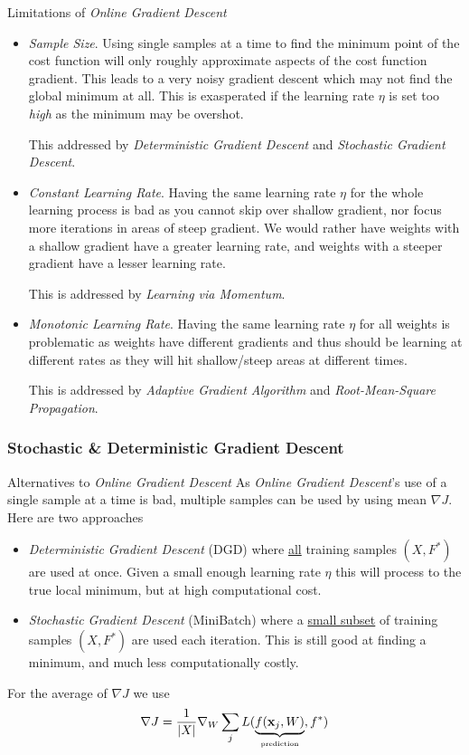 \documentclass[11pt,a4paper]{article}
\begin{document}
  \begin{remark}{Limitations of \textit{Online Gradient Descent}}
    \begin{itemize}
      \item \textit{Sample Size}. Using single samples at a time to find the minimum point of the cost function will only roughly approximate aspects of the cost function gradient. This leads to a very noisy gradient descent which may not find the global minimum at all. This is exasperated if the learning rate $\eta$ is set too \textit{high} as the minimum may be overshot.
      \par This addressed by \textit{Deterministic Gradient Descent} and \textit{Stochastic Gradient Descent}.
      \item \textit{Constant Learning Rate}. Having the same learning rate $\eta$ for the whole learning process is bad as you cannot skip over shallow gradient, nor focus more iterations in areas of steep gradient. We would rather have weights with a shallow gradient have a greater learning rate, and weights with a steeper gradient have a lesser learning rate.
      \par This is addressed by \textit{Learning via Momentum}.
      \item \textit{Monotonic Learning Rate}. Having the same learning rate $\eta$ for all weights is problematic as weights have different gradients and thus should be learning at different rates as they will hit shallow/steep areas at different times.
      \par This is addressed by \textit{Adaptive Gradient Algorithm} and \textit{Root-Mean-Square Propagation}.
    \end{itemize}
  \end{remark}

\subsubsection{Stochastic \& Deterministic Gradient Descent} \label{sec_SDGD}

  \begin{definition}{Alternatives to \textit{Online Gradient Descent}}
    As \textit{Online Gradient Descent}'s use of a single sample at a time is bad, multiple samples can be used by using mean $\nabla J$. Here are two approaches
    \begin{itemize}
      \item \textit{Deterministic Gradient Descent} (DGD) where \underline{all} training samples $(X,F^*)$ are used at once. Given a small enough learning rate $\eta$ this will process to the true local minimum, but at high computational cost.
      \item \textit{Stochastic Gradient Descent} (MiniBatch) where a \underline{small subset} of training samples $(X,F^*)$ are used each iteration. This is still good at finding a minimum, and much less computationally costly.
    \end{itemize}
    For the average of $\nabla J$ we use
    \[ \nabla J=\frac1{|X|}\nabla_W\sum_j L(\underbrace{f(\mathbf{x}_j,W)}_\text{\tiny prediction},f^*) \]
  \end{definition}
\end{document}
